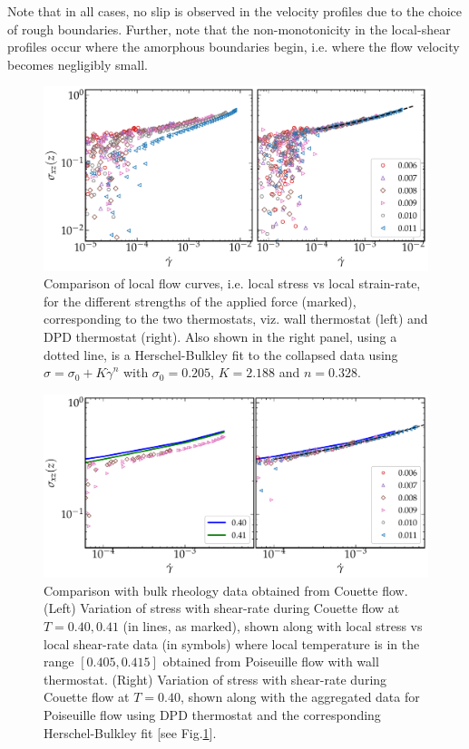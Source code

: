 Note that in all cases, no slip is observed in the velocity profiles due to the choice of rough boundaries. Further, note that the non-monotonicity in the local-shear profiles occur where the amorphous boundaries begin, i.e. where the flow velocity becomes negligibly small.

\begin{figure}
\centering
\includegraphics[width=15cm]{figs/stressStrain.pdf}
\caption[{\em Comparison of local flow curves for the different strengths of the applied force, corresponding to the two thermostats}]{Comparison of local flow curves, i.e. local stress vs local strain-rate, for the different strengths of the applied force (marked), corresponding to the two thermostats, viz. wall thermostat (left) and DPD thermostat (right). Also shown in the right panel, using a dotted line, is a Herschel-Bulkley fit to the collapsed data using $\sigma = \sigma_0 + K\dot{\gamma}^n$ with $\sigma_0 = 0.205$, $K = 2.188$ and $n = 0.328$.}
\label{localflow}
\end{figure}

\begin{figure}
\centering
\includegraphics[width=15cm]{figs/stressStrain_0p41.pdf}
\caption[{\em Comparison with bulk rheology data obtained from Couette flow}]{Comparison with bulk rheology data obtained from Couette flow. (Left) Variation of stress with shear-rate during Couette flow at $T=0.40, 0.41$ (in lines, as marked), shown along with local stress vs local shear-rate data (in symbols) where local temperature is in the range $[0.405,0.415]$ obtained from Poiseuille flow with wall thermostat. (Right) Variation of stress with shear-rate during Couette flow at $T=0.40$, shown along with the aggregated data for Poiseuille flow using DPD thermostat and the corresponding Herschel-Bulkley fit [see Fig.\ref{localflow}].}
\label{couettecompare}
\end{figure}

